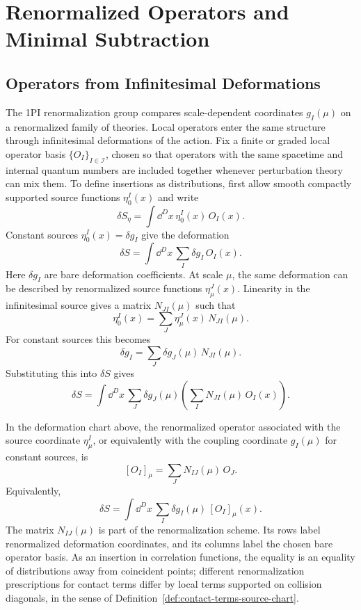 \chapter{Renormalized Operators and Minimal Subtraction}
\label{ch:volume-ii-renormalized-operators-minimal-subtraction}
\ConventionsEuclidean


\section{Operators from Infinitesimal Deformations}

The 1PI renormalization group compares scale-dependent coordinates
\(g_I(\mu)\) on a renormalized family of theories.  Local operators enter the
same structure through infinitesimal deformations of the action.  Fix a finite
or graded local operator basis \(\{O_I\}_{I\in\mathcal I}\), chosen so that
operators with the same spacetime and internal quantum numbers are included
together whenever perturbation theory can mix them.  To define insertions as
distributions, first allow smooth compactly supported source functions
\(\eta_0^I(x)\) and write
\[
  \delta S_\eta
  =
  \int \dd^D x\,\eta_0^I(x)\,O_I(x).
\]
Constant sources \(\eta_0^I(x)=\delta g_I\) give the deformation
\[
  \delta S
  =
  \int \dd^D x\,\sum_I \delta g_I\,O_I(x).
\]
Here \(\delta g_I\) are bare deformation coefficients.  At scale \(\mu\), the
same deformation can be described by renormalized source functions
\(\eta_\mu^J(x)\).  Linearity in the infinitesimal source gives a matrix
\(N_{JI}(\mu)\) such that
\[
  \eta_0^I(x)
  =
  \sum_J\eta_\mu^J(x)\,N_{JI}(\mu).
\]
For constant sources this becomes
\[
  \delta g_I
  =
  \sum_J\delta g_J(\mu)\,N_{JI}(\mu).
\]
Substituting this into \(\delta S\) gives
\[
  \delta S
  =
  \int \dd^D x\,\sum_J \delta g_J(\mu)
  \left(\sum_I N_{JI}(\mu)\,O_I(x)\right).
\]

\begin{definition}
In the deformation chart above, the renormalized operator associated with the
source coordinate \(\eta_\mu^I\), or equivalently with the coupling
coordinate \(g_I(\mu)\) for constant sources, is
\[
  [O_I]_\mu
  =
  \sum_J N_{IJ}(\mu)\,O_J .
\]
Equivalently,
\[
  \delta S
  =
  \int \dd^D x\,\sum_I \delta g_I(\mu)\,[O_I]_\mu(x).
\]
The matrix \(N_{IJ}(\mu)\) is part of the renormalization scheme.  Its rows
label renormalized deformation coordinates, and its columns label the chosen
bare operator basis.  As an insertion in correlation functions, the equality
is an equality of distributions away from coincident points; different
renormalization prescriptions for contact terms differ by local terms
supported on collision diagonals, in the sense of
Definition~\ref{def:contact-terms-source-chart}.
\end{definition}

